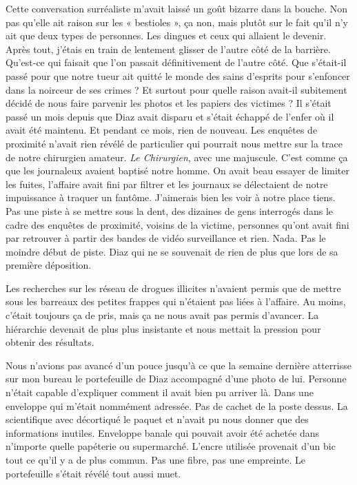 Cette conversation surréaliste m'avait laissé un goût bizarre dans la bouche. Non pas qu'elle ait raison sur les 
« bestioles », ça non, mais plutôt sur le fait qu'il n'y ait que deux types de personnes. Les dingues et ceux qui 
allaient le devenir. Après tout, j'étais en train de lentement glisser de l'autre côté de la barrière. Qu'est-ce qui 
faisait que l'on passait définitivement de l'autre côté. Que s'était-il passé pour que notre tueur ait quitté le monde 
des sains d'esprits pour s'enfoncer dans la noirceur de ses crimes ? Et surtout pour quelle raison avait-il subitement 
décidé de nous faire parvenir les photos et les papiers des victimes ? Il s'était passé un mois depuis que Diaz avait 
disparu et s'était échappé de l'enfer où il avait été maintenu. Et pendant ce mois, rien de nouveau. Les enquêtes de 
proximité n'avait rien révélé de particulier qui pourrait nous mettre sur la trace de notre chirurgien amateur. \emph{Le 
Chirurgien}, avec une majuscule. C'est comme ça que les journaleux avaient baptisé notre homme. On avait beau essayer de 
limiter les fuites, l'affaire avait fini par filtrer et les journaux se délectaient de notre impuissance à traquer un 
fantôme. J'aimerais bien les voir à notre place tiens. Pas une piste à se mettre sous la dent, des dizaines de gens 
interrogés dans le cadre des enquêtes de proximité, voisins de la victime, personnes qu'ont avait fini par retrouver à 
partir des bandes de vidéo surveillance et rien. Nada. Pas le moindre début de piste. Diaz qui ne se souvenait de rien 
de plus que lors de sa première déposition.

Les recherches sur les réseau de drogues illicites n'avaient permis que de mettre sous les barreaux des petites frappes 
qui n'étaient pas liées à l'affaire. Au moins, c'était toujours ça de pris, mais ça ne nous avait pas permis d'avancer. 
La hiérarchie devenait de plus plus insistante et nous mettait la pression pour obtenir des résultats.

Nous n'avions pas avancé d'un pouce jusqu'à ce que la semaine dernière atterrisse sur mon bureau le portefeuille de 
Diaz accompagné d'une photo de lui. Personne n'était capable d'expliquer comment il avait bien pu arriver là. Dans une 
enveloppe qui m'était nommément adressée. Pas de cachet de la poste dessus. La scientifique avec décortiqué le paquet 
et n'avait pu nous donner que des informations inutiles. Enveloppe banale qui pouvait avoir été achetée dans n'importe 
quelle papéterie ou supermarché. L'encre utilisée provenait d'un bic tout ce qu'il y a de plus commun.  Pas une fibre, 
pas une empreinte. Le portefeuille s'était révélé tout aussi muet.

